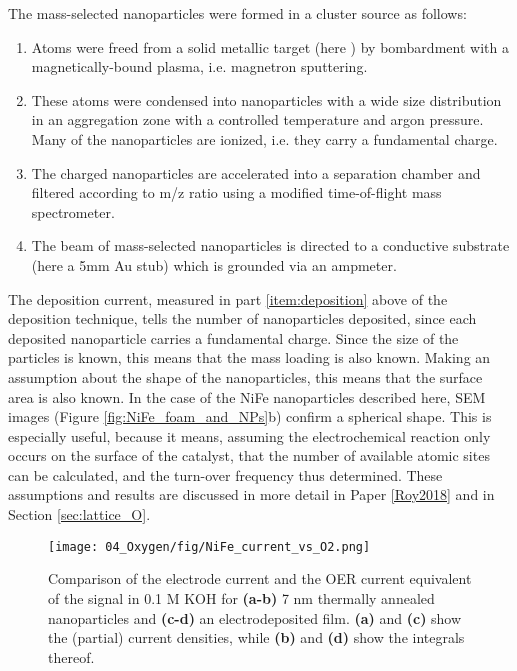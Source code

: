 The mass-selected nanoparticles were formed in a cluster source as follows\cite{VonIssendorff1999}: 
\begin{enumerate} 
	\item Atoms were freed from a solid metallic target (here ) by bombardment with a magnetically-bound plasma, i.e. magnetron sputtering. 
	
	\item These atoms were condensed into nanoparticles with a wide size distribution in an aggregation zone with a controlled temperature and argon pressure. Many of the nanoparticles are ionized, i.e. they carry a fundamental charge. 
	
	\item The charged nanoparticles are accelerated into a separation chamber and filtered according to m/z ratio using a modified time-of-flight mass spectrometer. 
	
	\item The beam of mass-selected nanoparticles is directed to a conductive substrate (here a 5mm Au stub) which is grounded via an ampmeter.  \label{item:deposition}
\end{enumerate}

The deposition current, measured in part \ref{item:deposition} above of the deposition technique, tells the number of nanoparticles deposited, since each deposited nanoparticle carries a fundamental charge. Since the size of the particles is known, this means that the mass loading is also known. Making an assumption about the shape of the nanoparticles, this means that the surface area is also known. In the case of the NiFe nanoparticles described here, SEM images (Figure \ref{fig:NiFe_foam_and_NPs}b) confirm a spherical shape. This is especially useful, because it means, assuming the electrochemical reaction only occurs on the surface of the catalyst, that the number of available atomic sites can be calculated, and the turn-over frequency thus determined. These assumptions and results are discussed in more detail in Paper \ref{Roy2018} and in Section \ref{sec:lattice_O}.


\begin{figure}[t]
	\centering
	\texttt{[image: 04\_Oxygen/fig/NiFe\_current\_vs\_O2.png]}
	\caption{Comparison of the electrode current and the OER current equivalent of the  signal in 0.1 M KOH for \textbf{(a-b)} 7 nm thermally annealed  nanoparticles and \textbf{(c-d)} an electrodeposited  film. \textbf{(a)} and \textbf{(c)} show the (partial) current densities, while \textbf{(b)} and \textbf{(d)} show the integrals thereof.}
	\label{fig:NiFe_current_vs_O2}
\end{figure}

